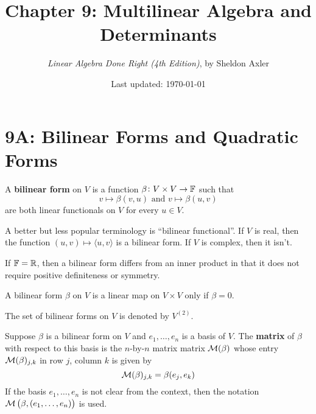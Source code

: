 \documentclass{extarticle}
\title{\vspace{-2em}Chapter 9: Multilinear Algebra and Determinants}
\author{\emph{Linear Algebra Done Right (4th Edition)}, by Sheldon Axler}
\date{Last updated: \today}
\begin{document}
\maketitle 
\tableofcontents
\newpage 


\section*{9A: Bilinear Forms and Quadratic Forms}

\begin{definition}
    A \textbf{bilinear form} on \(V\) is a function \(\beta \colon V \times V \to \mathbb{F}\) 
    such that 
    \[v \mapsto \beta(v, u) \text{  and  } v \mapsto \beta(u,v)\]
    are both linear functionals on \(V\) for every \(u \in V\).
\end{definition}

\begin{remark}
    A better but less popular terminology is ``bilinear functional''. If \(V\) is real, 
    then the function \((u, v) \mapsto \langle u,v \rangle\) is a bilinear form. If \(V\) is 
    complex, then it isn't.
\end{remark}

\begin{remark}
    If \(\mathbb{F} = \mathbb{R}\), then a bilinear form differs from an inner product in that it does not require 
    positive definiteness or symmetry. 
\end{remark}

\begin{remark}
    A bilinear form \(\beta\) on \(V\) is a linear map on \(V \times V\) only if \(\beta = 0\).
\end{remark}

\begin{definition}[\(V^{(2)}\)]
    The set of bilinear forms on \(V\) is denoted by \(V^{(2)}\).
\end{definition}

\begin{definition}
    Suppose \(\beta\) is a bilinear form on \(V\) and \(e_1, \ldots, e_n\) is a basis of \(V\). The \textbf{matrix}
    of \(\beta\) with respect to this basis is the \(n\)-by-\(n\) matrix matrix \(\mathcal{M}(\beta)\) whose entry 
    \(\mathcal{M}(\beta)_{j, k}\) in row \(j\), column \(k\) is given by 
    \[\mathcal{M} (\beta)_{j, k} = \beta (e_j, e_k)\]
    If the basis \(e_1, \ldots, e_n\) is not clear from the context, then the notation 
    \(\mathcal{M} \left( \beta, (e_1, \ldots, e_n) \right)\) is used. 
\end{definition}
\end{document}
